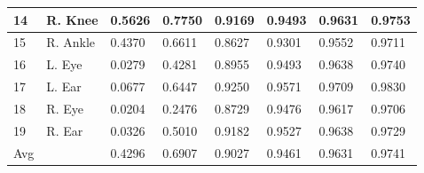 \documentclass[10pt,letterpaper]{article}
\begin{document}
\begin{table}[!ht]
\begin{adjustwidth}{-2.25in}{0in}
\begin{tabular}{|l|l|l|l|l|l|l|l|}
		14    &  R. Knee        &  0.5626     &  0.7750      &  0.9169      &  0.9493      &   0.9631     &  0.9753      \\ \hline
		15    &  R. Ankle        & 0.4370  &   0.6611     &   0.8627     &  0.9301      &    0.9552    &   0.9711     \\ \hline
		16    &  L. Eye        & 0.0279      &  0.4281      &  0.8955      & 0.9493       &  0.9638      &  0.9740      \\ \hline
		17    &  L. Ear        &  0.0677     &  0.6447      &  0.9250     & 0.9571       &   0.9709     &  0.9830      \\ \hline
		18    &  R. Eye        & 0.0204      &  0.2476      &  0.8729      & 0.9476       &  0.9617      & 0.9706       \\ \hline
		19    &  R. Ear        & 0.0326      &  0.5010      &  0.9182      &  0.9527      &  0.9638      &  0.9729      \\ \hline
		Avg    &  &  0.4296        & 0.6907      & 0.9027       &  0.9461      &   0.9631     &   0.9741             \\ \hline
	\end{tabular}
	\label{table:PCKsigma15}
\end{adjustwidth}
\end{table}
\end{document}
